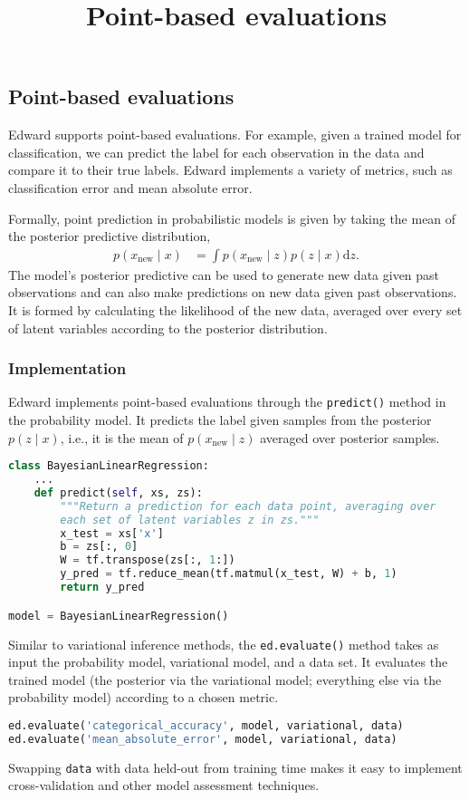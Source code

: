 \title{Point-based evaluations}

\subsection{Point-based evaluations}

Edward supports point-based evaluations. For example, given a trained
model for classification, we can predict the label for each
observation in the data and compare it to their true labels. Edward
implements a variety of metrics, such as classification error and mean
absolute error.

Formally, point prediction in probabilistic models is given by
taking the mean of the posterior predictive distribution,
\begin{align*}
  p(x_\text{new} \mid x)
  &=
  \int
  p(x_\text{new} \mid z)
  p(z \mid x)
  \text{d} z.
\end{align*}
The model's posterior predictive can be used to generate new data
given past observations and can also make predictions on new data
given past observations.
It is formed by calculating the likelihood of the new data, averaged
over every set of latent variables according to the posterior
distribution.

\subsubsection{Implementation}

Edward implements point-based evaluations through the
\texttt{predict()} method in the probability model. It predicts the
label given samples from the posterior $p(z \mid x)$, i.e., it is the
mean of $p(x_\text{new} \mid z)$ averaged over posterior samples.
\begin{lstlisting}[language=Python]
class BayesianLinearRegression:
    ...
    def predict(self, xs, zs):
        """Return a prediction for each data point, averaging over
        each set of latent variables z in zs."""
        x_test = xs['x']
        b = zs[:, 0]
        W = tf.transpose(zs[:, 1:])
        y_pred = tf.reduce_mean(tf.matmul(x_test, W) + b, 1)
        return y_pred

model = BayesianLinearRegression()
\end{lstlisting}
Similar to variational inference methods, the
\texttt{ed.evaluate()} method takes as input the probability model,
variational model, and a data set. It evaluates the trained model (the
posterior via the variational model; everything else via the
probability model) according to a chosen metric.
\begin{lstlisting}[language=Python]
ed.evaluate('categorical_accuracy', model, variational, data)
ed.evaluate('mean_absolute_error', model, variational, data)
\end{lstlisting}
Swapping \texttt{data} with data held-out from training time makes it
easy to implement cross-validation and other model assessment
techniques.

